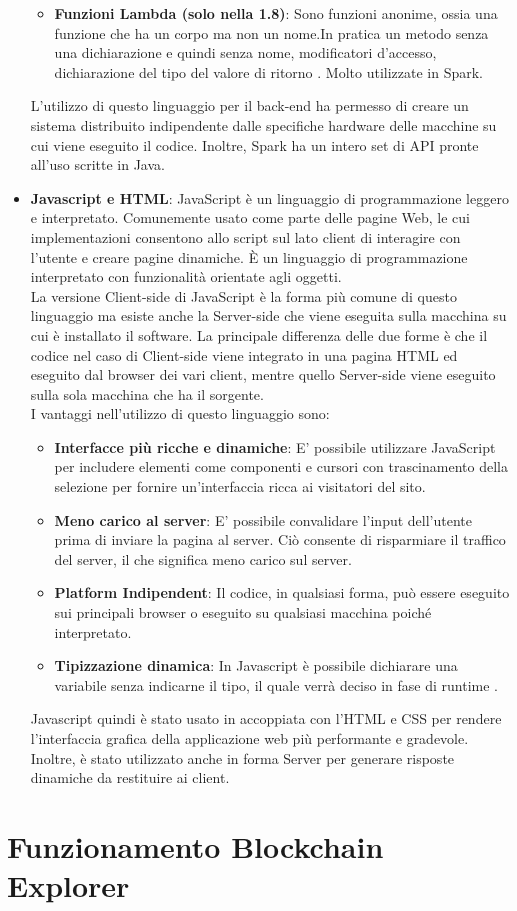 \begin{itemize}
\begin{itemize}
\item \textbf{Funzioni Lambda (solo nella 1.8)}: Sono funzioni anonime, ossia una funzione che ha un corpo ma non un nome.In pratica un metodo senza una dichiarazione e quindi senza nome, modificatori d'accesso, dichiarazione del tipo del valore di ritorno \cite{java:tutorialspoint}. Molto utilizzate in Spark.
\end{itemize}
L'utilizzo di questo linguaggio per il back-end ha permesso di creare un sistema distribuito indipendente dalle specifiche hardware delle macchine su cui viene eseguito il codice. Inoltre, Spark ha un intero set di API pronte all'uso scritte in Java.
\item \textbf{Javascript e HTML}: JavaScript è un linguaggio di programmazione leggero e interpretato. Comunemente usato come parte delle pagine Web, le cui implementazioni consentono allo script sul lato client di interagire con l'utente e creare pagine dinamiche. È un linguaggio di programmazione interpretato con funzionalità orientate agli oggetti.
\\La versione Client-side di JavaScript è la forma più comune di questo linguaggio ma esiste anche la Server-side che viene eseguita sulla macchina su cui è installato il software. La principale differenza delle due forme è che il codice nel caso di Client-side viene integrato in una pagina HTML ed eseguito dal browser dei vari client, mentre quello Server-side viene eseguito sulla sola macchina che ha il sorgente.
\\I vantaggi nell'utilizzo di questo linguaggio sono:
\begin{itemize}
\item \textbf{Interfacce più ricche e dinamiche}: E' possibile utilizzare JavaScript per includere elementi come componenti e cursori con trascinamento della selezione per fornire un'interfaccia ricca ai visitatori del sito.
\item \textbf{Meno carico al server}: E' possibile convalidare l'input dell'utente prima di inviare la pagina al server. Ciò consente di risparmiare il traffico del server, il che significa meno carico sul server.
\item \textbf{Platform Indipendent}: Il codice, in qualsiasi forma, può essere eseguito sui principali browser o eseguito su qualsiasi macchina poiché interpretato. 
\item \textbf{Tipizzazione dinamica}: In Javascript è possibile dichiarare una variabile senza indicarne il tipo, il quale verrà deciso in fase di runtime \cite{javascript:tutorialspoint}.
\end{itemize}
Javascript quindi è stato usato in accoppiata con l'HTML e CSS per rendere l'interfaccia grafica della applicazione web più performante e gradevole. Inoltre, è stato utilizzato anche in forma Server per generare risposte dinamiche da restituire ai client.
\end{itemize} 


\chapter{Funzionamento Blockchain Explorer}
\label{chap:Funzionamento Blockchain Explorer}

